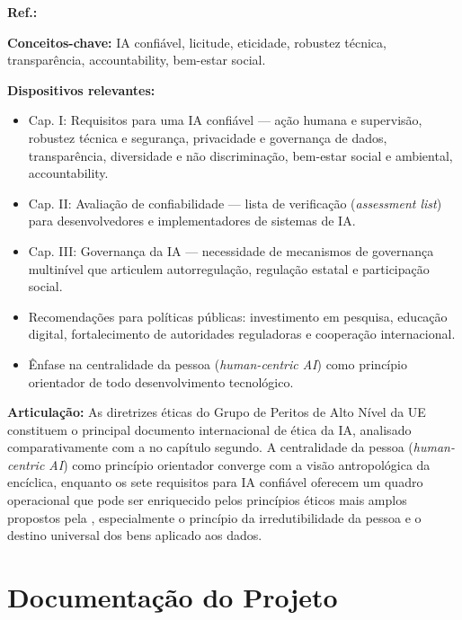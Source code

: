 \begin{fichamento}
    \textbf{Ref.:} \cite{HighLevelExpertGroup2019EA}
    
    \textbf{Conceitos-chave:} IA confiável, licitude, eticidade, robustez técnica, transparência, accountability, bem-estar social.
    
    \textbf{Dispositivos relevantes:}
    \begin{itemize}
        \item Cap. I: Requisitos para uma IA confiável — ação humana e supervisão, robustez técnica e segurança, privacidade e governança de dados, transparência, diversidade e não discriminação, bem-estar social e ambiental, accountability.
        \item Cap. II: Avaliação de confiabilidade — lista de verificação (\textit{assessment list}) para desenvolvedores e implementadores de sistemas de IA.
        \item Cap. III: Governança da IA — necessidade de mecanismos de governança multinível que articulem autorregulação, regulação estatal e participação social.
        \item Recomendações para políticas públicas: investimento em pesquisa, educação digital, fortalecimento de autoridades reguladoras e cooperação internacional.
        \item Ênfase na centralidade da pessoa (\textit{human-centric AI}) como princípio orientador de todo desenvolvimento tecnológico.
    \end{itemize}
    
    \textbf{Articulação:} As diretrizes éticas do Grupo de Peritos de Alto Nível da UE constituem o principal documento internacional de ética da IA, analisado comparativamente com a \MH{} no capítulo segundo. A centralidade da pessoa (\textit{human-centric AI}) como princípio orientador converge com a visão antropológica da encíclica, enquanto os sete requisitos para IA confiável oferecem um quadro operacional que pode ser enriquecido pelos princípios éticos mais amplos propostos pela \MH{}, especialmente o princípio da irredutibilidade da pessoa e o destino universal dos bens aplicado aos dados.
\end{fichamento}

\section{Documentação do Projeto}

